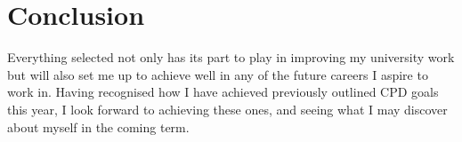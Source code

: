 \documentclass{scrartcl}
\begin{document}
\section{Conclusion}
Everything selected not only has its part to play in improving my university work but will also set me up to achieve well in any of the future careers I aspire to work in. Having recognised how I have achieved previously outlined CPD goals this year, I look forward to achieving these ones, and seeing what I may discover about myself in the coming term. 

	
	
\end{document}
